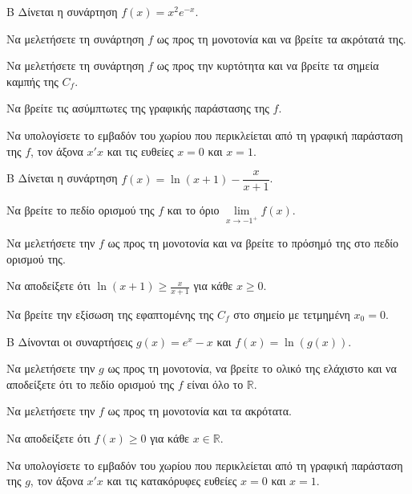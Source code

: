 \begin{thema}{Β}
Δίνεται η συνάρτηση $f(x) = x^2 e^{-x}$.
\begin{erwthma}
\item Να μελετήσετε τη συνάρτηση $f$ ως προς τη μονοτονία και να βρείτε τα ακρότατά της.
\item Να μελετήσετε τη συνάρτηση $f$ ως προς την κυρτότητα και να βρείτε τα σημεία καμπής της $C_f$.
\item Να βρείτε τις ασύμπτωτες της γραφικής παράστασης της $f$.
\item Να υπολογίσετε το εμβαδόν του χωρίου που περικλείεται από τη γραφική παράσταση της $f$, τον άξονα $x'x$ και τις ευθείες $x=0$ και $x=1$.
\end{erwthma}
\end{thema}

\begin{thema}{Β}
Δίνεται η συνάρτηση $f(x) = \ln(x+1) - \dfrac{x}{x+1}$.
\begin{erwthma}
\item Να βρείτε το πεδίο ορισμού της $f$ και το όριο $\lim\limits_{x \to -1^+} f(x)$. 
\item Να μελετήσετε την $f$ ως προς τη μονοτονία και να βρείτε το πρόσημό της στο πεδίο ορισμού της.
\item Να αποδείξετε ότι $\ln(x+1) \ge \frac{x}{x+1}$ για κάθε $x \ge 0$.
\item Να βρείτε την εξίσωση της εφαπτομένης της $C_f$ στο σημείο με τετμημένη $x_0=0$.
\end{erwthma}
\end{thema}

\begin{thema}{Β}
Δίνονται οι συναρτήσεις $g(x) = e^x - x$ και $f(x) = \ln(g(x))$.
\begin{erwthma}
\item Να μελετήσετε την $g$ ως προς τη μονοτονία, να βρείτε το ολικό της ελάχιστο και να αποδείξετε ότι το πεδίο ορισμού της $f$ είναι όλο το $\mathbb{R}$.
\item Να μελετήσετε την $f$ ως προς τη μονοτονία και τα ακρότατα.
\item Να αποδείξετε ότι $f(x) \ge 0$ για κάθε $x \in \mathbb{R}$.
\item Να υπολογίσετε το εμβαδόν του χωρίου που περικλείεται από τη γραφική παράσταση της $g$, τον άξονα $x'x$ και τις κατακόρυφες ευθείες $x=0$ και $x=1$.
\end{erwthma}
\end{thema}

